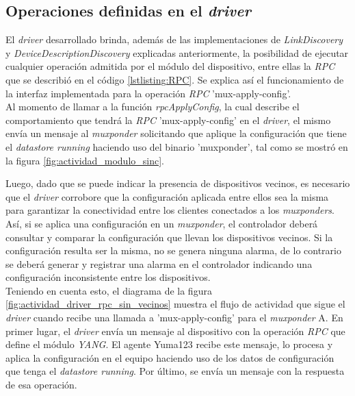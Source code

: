   \subsection{Operaciones definidas en el \textit{driver}} \label{drivermux}

  El \textit{driver} desarrollado brinda, además de las implementaciones de \textit{LinkDiscovery} y \textit{DeviceDescriptionDiscovery} explicadas anteriormente, la posibilidad de ejecutar cualquier operación admitida por el módulo del dispositivo, entre ellas la \textit{RPC} que se describió en el código \ref{lstlisting:RPC}. Se explica así el funcionamiento de la interfaz implementada para la operación \textit{RPC} 'mux-apply-config'. 
  \\

  Al momento de llamar a la función \textit{rpcApplyConfig}, la cual describe el comportamiento que tendrá la \textit{RPC} 'mux-apply-config' en el \textit{driver}, el mismo envía un mensaje al \textit{muxponder} solicitando que aplique la configuración que tiene el \textit{datastore running} haciendo uso del binario 'muxponder', tal como se mostró en la figura \ref{fig:actividad_modulo_sinc}.
  
  Luego, dado que se puede indicar la presencia de dispositivos vecinos, es necesario que el \textit{driver} corrobore que la configuración aplicada entre ellos sea la misma para garantizar la conectividad entre los clientes conectados a los \textit{muxponders}. Así, si se aplica una configuración en un \textit{muxponder}, el controlador deberá consultar y comparar la configuración que llevan los dispositivos vecinos. Si la configuración resulta ser la misma, no se genera ninguna alarma, de lo contrario se deberá generar y registrar una alarma en el controlador indicando una configuración inconsistente entre los dispositivos.
  \\

  Teniendo en cuenta esto, el diagrama de la figura \ref{fig:actividad_driver_rpc_sin_vecinos} muestra el flujo de actividad que sigue el \textit{driver} cuando recibe una llamada a 'mux-apply-config' para el \textit{muxponder} A. 
  En primer lugar, el \textit{driver} envía un mensaje al dispositivo con la operación \textit{RPC} que define el módulo \textit{YANG}. El agente Yuma123 recibe este mensaje, lo procesa y aplica la configuración en el equipo haciendo uso de los datos de configuración que tenga el \textit{datastore running}. Por último, se envía un mensaje con la respuesta de esa operación.  

